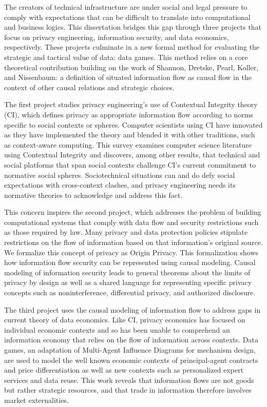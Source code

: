 \documentclass[../thesis.tex]{subfiles}
\begin{document}
 The creators of technical infrastructure are under social and
 legal pressure to comply with expectations that can be difficult
 to translate into computational and business logics.
 This dissertation bridges this gap through three projects that focus on
 privacy engineering, information security, and data economics, respectively.
 These projects culminate in a new formal method for evaluating the strategic
 and tactical value of data: data games.
 This method relies on a core theoretical contribution building on the work of
 Shannon, Dretske, Pearl, Koller, and Nissenbaum:
 a definition of situated information
 flow as causal flow in the context
 of other causal relations and strategic choices.

 The first project studies privacy engineering's use of
 Contextual Integrity theory (CI), which defines
 privacy as appropriate information flow according to norms
 specific to social contexts or spheres.
 Computer scientists using CI
 have innovated as they have implemented the theory and
 blended it with other traditions, such as context-aware
 computing. This survey examines
 computer science literature using Contextual Integrity and
 discovers, among other results, that technical and social platforms
 that span social contexts challenge CI's current commitment
 to normative social spheres.
 Sociotechnical situations can and do defy social expectations
 with cross-context clashes, and privacy engineering
 needs its normative theories to acknowledge and address this
 fact.
 
 This concern inspires the second project, which addresses the
 problem of building computational systems that comply with data
 flow and security restrictions such as those required by law.
 Many privacy and data protection policies stipulate
 restrictions on the flow of information based on that
 information's original source.
 We formalize this concept of privacy as Origin Privacy.
 This formalization shows how information flow security
 can be represented using causal modeling.
 Causal modeling of information security leads to
 general theorems about the limits of privacy by design
 as well as a shared language for representing specific
 privacy concepts such as noninterference, differential
 privacy, and authorized disclosure.

 The third project uses the causal modeling of information
 flow to address gaps in current theory of data economics.
 Like CI, privacy economics has focused on individual
 economic contexts and so has been unable to comprehend
 an information economy that relies on the flow of
 information across contexts.
 Data games, an adaptation of Multi-Agent Influence Diagrams
 for mechanism design, are used to model the well known
 economic contexts of principal-agent contracts and
 price differentiation as well as new contexts
 such as personalized expert services and data reuse.
 This work reveals that information flows are not
 goods but rather strategic resources, and that
 trade in information therefore involves
 market externalities.
 
 
\end{document}

